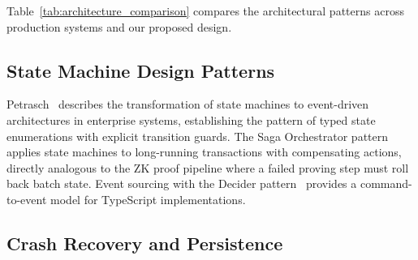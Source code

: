 Table~\ref{tab:architecture_comparison} compares the architectural patterns
across production systems and our proposed design.

\begin{table}[t]
\centering
\caption{Production ZK Node Architecture Comparison}
\label{tab:architecture_comparison}
\end{table}

\subsection{State Machine Design Patterns}

Petrasch~\cite{petrasch2018statemachine} describes the transformation of
state machines to event-driven architectures in enterprise systems,
establishing the pattern of typed state enumerations with explicit transition
guards. The Saga Orchestrator pattern~\cite{saga2024orchestrator} applies
state machines to long-running transactions with compensating actions,
directly analogous to the ZK proof pipeline where a failed proving step
must roll back batch state. Event sourcing with the Decider
pattern~\cite{eventsourcing2024typescript} provides a command-to-event
model for TypeScript implementations.

\subsection{Crash Recovery and Persistence}

